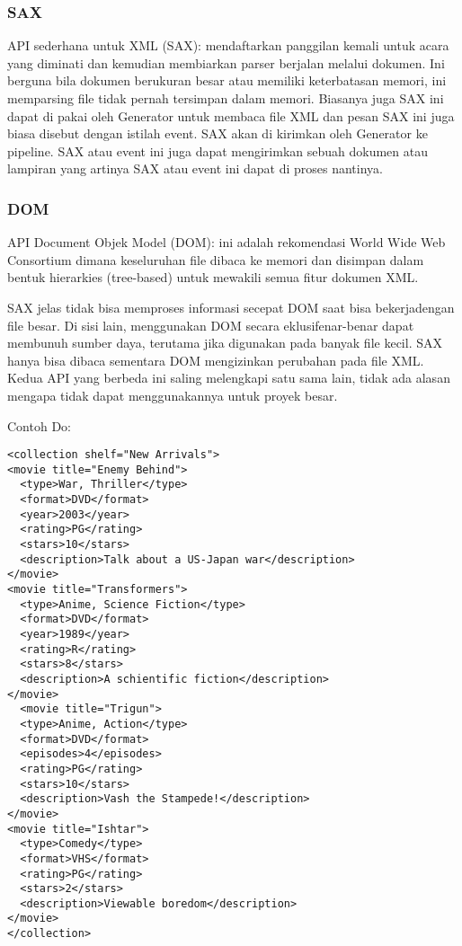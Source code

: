 \subsubsection {SAX}
  API sederhana untuk XML (SAX): mendaftarkan panggilan kemali untuk acara yang diminati dan kemudian membiarkan parser berjalan melalui dokumen. Ini berguna bila dokumen berukuran besar atau memiliki keterbatasan memori, ini memparsing file tidak pernah tersimpan dalam memori. Biasanya juga SAX ini dapat di pakai oleh Generator untuk membaca file XML dan pesan SAX ini juga biasa disebut dengan istilah event. SAX akan di kirimkan oleh Generator ke pipeline. SAX atau event ini juga dapat mengirimkan sebuah dokumen atau lampiran yang artinya SAX atau event ini dapat di proses nantinya.
  
\subsubsection {DOM}
  API Document Objek Model (DOM): ini adalah rekomendasi World Wide Web Consortium dimana keseluruhan file dibaca ke memori dan disimpan dalam bentuk hierarkies (tree-based) untuk mewakili semua fitur dokumen XML. 

SAX jelas tidak bisa memproses informasi secepat DOM saat bisa bekerjadengan file besar. Di sisi lain, menggunakan DOM secara eklusifenar-benar dapat membunuh sumber daya, terutama jika digunakan pada banyak file kecil. SAX hanya bisa dibaca sementara DOM mengizinkan perubahan pada file XML. Kedua API yang berbeda ini saling melengkapi satu sama lain, tidak ada alasan mengapa tidak dapat menggunakannya untuk proyek besar. 

Contoh Do: 
\begin{verbatim}
<collection shelf="New Arrivals"> 
<movie title="Enemy Behind"> 
  <type>War, Thriller</type> 
  <format>DVD</format> 
  <year>2003</year> 
  <rating>PG</rating> 
  <stars>10</stars>
  <description>Talk about a US-Japan war</description> 
</movie> 
<movie title="Transformers"> 
  <type>Anime, Science Fiction</type> 
  <format>DVD</format> 
  <year>1989</year> 
  <rating>R</rating> 
  <stars>8</stars> 
  <description>A schientific fiction</description> 
</movie> 
  <movie title="Trigun"> 
  <type>Anime, Action</type> 
  <format>DVD</format> 
  <episodes>4</episodes>  
  <rating>PG</rating> 
  <stars>10</stars> 
  <description>Vash the Stampede!</description> 
</movie>
<movie title="Ishtar"> 
  <type>Comedy</type> 
  <format>VHS</format> 
  <rating>PG</rating> 
  <stars>2</stars> 
  <description>Viewable boredom</description> 
</movie> 
</collection> 
\end{verbatim}

